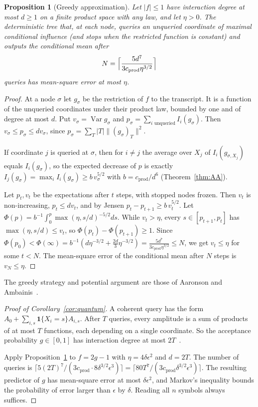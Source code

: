 \documentclass[11pt]{article}
\numberwithin{equation}{section}
\newtheorem{proposition}[theorem]{Proposition}
\theoremstyle{definition}
\theoremstyle{remark}
\newcommand{\1}{\mathbf 1}
\newcommand{\Var}{\operatorname{Var}}
\newcommand{\cprod}{c_{\mathrm{prod}}}
\begin{document}
\begin{proposition}[Greedy approximation]\label{prop:greedy}
Let $|f|\le1$ have interaction degree at most $d\ge1$ on a finite product space with any law, and let $\eta>0$. The deterministic tree that, at each node, queries an unqueried coordinate of maximal conditional influence (and stops when the restricted function is constant) and outputs the conditional mean after
\[
N=\Bigl\lceil\frac{5d^7}{3\cprod\eta^{3/2}}\Bigr\rceil
\]
queries has mean-square error at most $\eta$.
\end{proposition}
\begin{proof}
At a node $\sigma$ let $g_\sigma$ be the restriction of $f$ to the transcript. It is a function of the unqueried coordinates under their product law, bounded by one and of degree at most $d$. Put $v_\sigma=\Var g_\sigma$ and $p_\sigma=\sum_{i\text{ unqueried}}I_i(g_\sigma)$. Then $v_\sigma\le p_\sigma\le dv_\sigma$, since $p_\sigma=\sum_{T}|T|\|(g_\sigma)_T\|^2$.

If coordinate $j$ is queried at $\sigma$, then for $i\ne j$ the average over $X_j$ of $I_i(g_{\sigma,X_j})$ equals $I_i(g_\sigma)$, so the expected decrease of $p$ is exactly $I_j(g_\sigma)=\max_iI_i(g_\sigma)\ge b\,v_\sigma^{5/2}$ with $b=\cprod/d^6$ (Theorem~\ref{thm:AA}).

Let $p_t,v_t$ be the expectations after $t$ steps, with stopped nodes frozen. Then $v_t$ is non-increasing, $p_t\le dv_t$, and by Jensen $p_t-p_{t+1}\ge b\,v_t^{5/2}$. Let $\Phi(p)=b^{-1}\int_0^p\max(\eta,s/d)^{-5/2}ds$. While $v_t>\eta$, every $s\in[p_{t+1},p_t]$ has $\max(\eta,s/d)\le v_t$, so $\Phi(p_t)-\Phi(p_{t+1})\ge1$. Since $\Phi(p_0)<\Phi(\infty)=b^{-1}(d\eta^{-3/2}+\frac{2d}3\eta^{-3/2})=\frac{5d^7}{3\cprod\eta^{3/2}}\le N$, we get $v_t\le\eta$ for some $t<N$. The mean-square error of the conditional mean after $N$ steps is $v_N\le\eta$.
\end{proof}

The greedy strategy and potential argument are those of Aaronson and Ambainis~\cite{AA14}.

\begin{proof}[Proof of Corollary~\ref{cor:quantum}]
A coherent query has the form $A_0+\sum_{i,s}\1\{X_i=s\}A_{i,s}$. After $T$ queries, every amplitude is a sum of products of at most $T$ functions, each depending on a single coordinate. So the acceptance probability $g\in[0,1]$ has interaction degree at most $2T$~\cite{BBCMW01}.

Apply Proposition~\ref{prop:greedy} to $f=2g-1$ with $\eta=4\delta\epsilon^2$ and $d=2T$. The number of queries is $\lceil5(2T)^7/(3\cprod\cdot8\delta^{3/2}\epsilon^3)\rceil=\lceil80T^7/(3\cprod\delta^{3/2}\epsilon^3)\rceil$. The resulting predictor of $g$ has mean-square error at most $\delta\epsilon^2$, and Markov's inequality bounds the probability of error larger than $\epsilon$ by $\delta$. Reading all $n$ symbols always suffices.
\end{proof}
\end{document}

